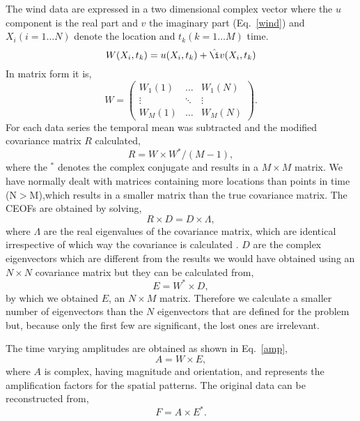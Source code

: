 The wind data are expressed in a two dimensional complex vector
where the $u$ component is the real part and $v$ the imaginary
part (Eq.~\ref{wind}) and $X_{i}(i=1\ldots N)$ denote the location
and $t_{k}(k=1\ldots M)$ time.
\begin{equation}\label{wind}
  W(X_{i},t_{k})=u(X_{i},t_{k})+\hat{\i}v(X_{i},t_{k})
\end{equation}
In matrix form it is,
\[W=\left(
\begin{array}{ccc}\label{matrix}
  W_{1}(1) & \ldots & W_{1}(N) \\
  \vdots & \ddots & \vdots \\
  W_{M}(1) & \ldots & W_{M}(N)
\end{array} \right).\]
For each data series the temporal mean was subtracted and the
modified covariance matrix $R$ calculated,
\begin{equation}\label{cov}
R=W\times W^{*}/(M-1),
\end{equation}
where the $^{*}$ denotes the complex conjugate and results in a
$M\times M$ matrix. We have normally dealt with matrices
containing more locations than points in time (N$>$M),which
results in a smaller matrix than the true covariance matrix. The
CEOFs are obtained by solving,
\begin{equation}\label{eigs}
  R\times D=D\times \Lambda,
\end{equation}
where $\Lambda$ are the real eigenvalues of the covariance matrix,
which are identical irrespective of which way the covariance is
calculated \citep{Kelly88}. $D$ are the complex eigenvectors which
are different from the results we would have obtained using an
$N\times N$ covariance matrix but they can be calculated from,
\begin{equation}\label{recon}
  E=W^{*}\times D,
\end{equation}
by which we obtained $E$, an $N\times M$ matrix. Therefore we
calculate a smaller number of eigenvectors than the $N$
eigenvectors that are defined for the problem but, because only
the first few are significant, the lost ones are irrelevant.

The time varying amplitudes are obtained as shown in
Eq.~\ref{amp},
\begin{equation}\label{amp}
  A=W\times E,
\end{equation}
where $A$ is complex, having magnitude and orientation, and
represents the amplification factors for the spatial patterns. The
original data can be reconstructed from,
\begin{equation}\label{orig}
F=A\times E^{*}.
\end{equation}

